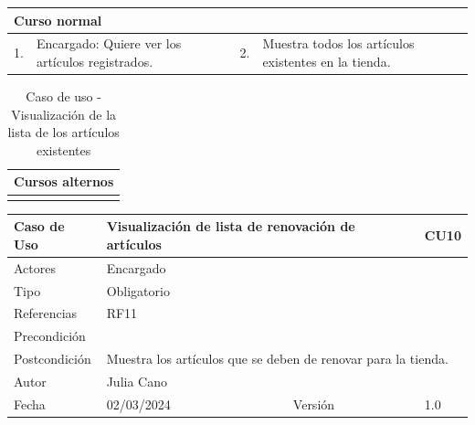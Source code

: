 \begin{table}[H]
	\centering
	\begin{tabular}{| m{} | m{} | m{} | m{} |}
		\hline
		\multicolumn{4}{|m{0.9\textwidth}|}{Curso normal}     \\ 
		\hline
		1. & Encargado: Quiere ver los artículos registrados. & 2. &  Muestra todos los artículos existentes en la tienda.  \\ 
		\hline
	\end{tabular}
\end{table}

\begin{table}[H]
	\centering
	\begin{tabular}{| m{} | m{} | m{} | m{} |}
		\hline
		\multicolumn{4}{|m{0.9\textwidth}|}{Cursos alternos}     \\ 
		\hline
		& \multicolumn{3}{m{0.67\textwidth}|}{} \\ 
		\hline
	\end{tabular}
	\caption{Caso de uso - Visualización de la lista de los artículos existentes}
\end{table}

\newpage



\begin{table}[H]
	\centering
	\begin{tabular}{| m{} | m{} | m{} | m{}|}
		\hline
		\rowcolor{grayshade} Caso de Uso & \multicolumn{2}{|m{0.43\textwidth}|}{Visualización de lista de renovación de artículos} &  CU10\\ 
		\hline
		Actores & \multicolumn{3}{l|}{Encargado} \\ 
		\hline
		Tipo & \multicolumn{3}{l|}{Obligatorio} \\ 
		\hline
		Referencias & \multicolumn{3}{l|}{RF11} \\ 
		\hline
		Precondición & \multicolumn{3}{m{0.67\textwidth}|}{} \\ 
		\hline
		Postcondición & \multicolumn{3}{m{0.67\textwidth}|}{Muestra los artículos que se deben de renovar para la tienda.} \\ 
		\hline
		Autor & \multicolumn{3}{l|}{Julia Cano} \\ 
		\hline
		Fecha & 02/03/2024 & Versión & 1.0 \\
		\hline
	\end{tabular}
\end{table}

